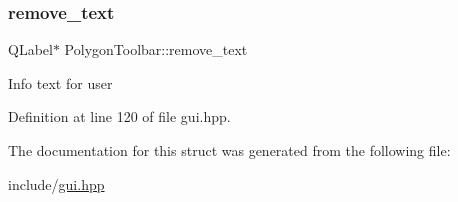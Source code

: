 \subsubsection{\texorpdfstring{remove\+\_\+text}{remove\_text}}
{\footnotesize\ttfamily Q\+Label$\ast$ Polygon\+Toolbar\+::remove\+\_\+text}

Info text for user 

Definition at line 120 of file gui.\+hpp.



The documentation for this struct was generated from the following file\+:\begin{DoxyCompactItemize}
\item 
include/\mbox{\hyperlink{gui_8hpp}{gui.\+hpp}}\end{DoxyCompactItemize}

